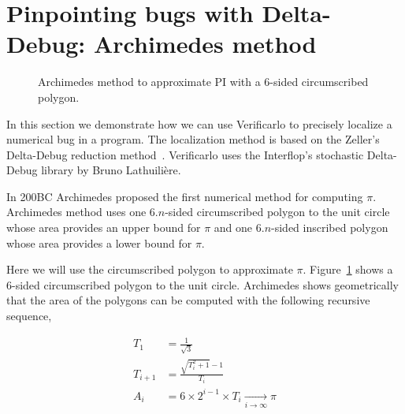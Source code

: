\section{Pinpointing bugs with Delta-Debug: Archimedes method}

\begin{figure}[h]
  \centering
  \caption{Archimedes method to approximate PI with a 6-sided circumscribed polygon.
    \label{fig:archimedes}
  }
\end{figure}

In this section we demonstrate how we can use Verificarlo to precisely localize a numerical bug in a program. The localization method is based on the Zeller's Delta-Debug reduction method~\cite{zeller2001automated}. Verificarlo uses the Interflop's stochastic Delta-Debug library by Bruno Lathuilière.

In 200BC Archimedes proposed the first numerical method for computing $\pi$.
Archimedes method uses one $6.n$-sided circumscribed polygon to the unit circle
whose area provides an upper bound for $\pi$ and one $6.n$-sided inscribed polygon
whose area provides a lower bound for $\pi$.

Here we will use the circumscribed polygon to approximate $\pi$.
Figure~\ref{fig:archimedes} shows a 6-sided circumscribed polygon to the unit
circle. Archimedes shows geometrically that the area of the polygons can be computed
with the following recursive sequence,

\begin{align*}
  T_1 &= \frac{1}{\sqrt{3}} \\
  T_{i+1} &= \frac{\sqrt{T_i^2+1} - 1}{T_i} \\
  A_{i} &= 6 \times 2^{i-1} \times T_{i} \xrightarrow[i \to \infty]{} \pi
\end{align*}

